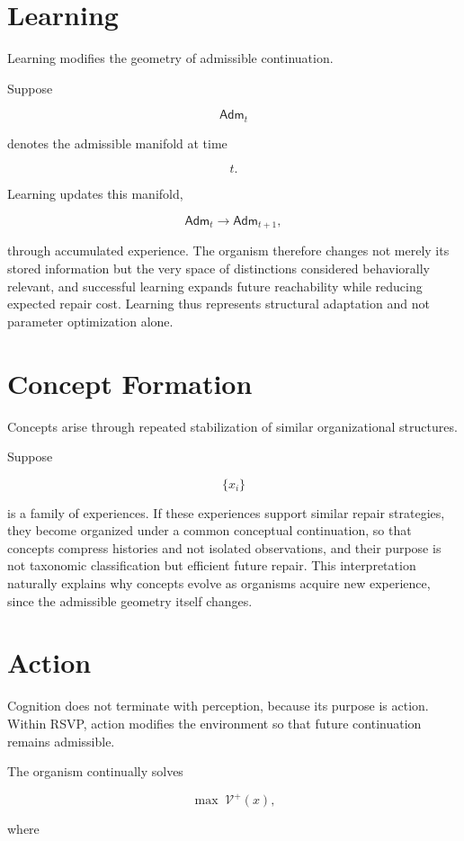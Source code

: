 \documentclass[11pt,oneside]{book}
\numberwithin{equation}{chapter}
\theoremstyle{definition}
\theoremstyle{plain}
\newcommand{\Adm}{\mathsf{Adm}}
\begin{document}
\section{Learning}

Learning modifies the geometry of admissible continuation.

Suppose

\[
\Adm_t
\]

denotes the admissible manifold at time

\[
t.
\]

Learning updates this manifold,

\[
\Adm_t
\longrightarrow
\Adm_{t+1},
\]

through accumulated experience. The organism therefore changes not merely its stored information but the very space of distinctions considered behaviorally relevant, and successful learning expands future reachability while reducing expected repair cost. Learning thus represents structural adaptation and not parameter optimization alone.

\section{Concept Formation}

Concepts arise through repeated stabilization of similar organizational
structures.

Suppose

\[
\{x_i\}
\]

is a family of experiences. If these experiences support similar repair strategies, they become organized under a common conceptual continuation, so that concepts compress histories and not isolated observations, and their purpose is not taxonomic classification but efficient future repair. This interpretation naturally explains why concepts evolve as organisms acquire new experience, since the admissible geometry itself changes.

\section{Action}

Cognition does not terminate with perception, because its purpose is action. Within RSVP, action modifies the environment so that future continuation remains admissible.

The organism continually solves

\[
\max \; \mathcal V^+(x),
\]

where
\end{document}
